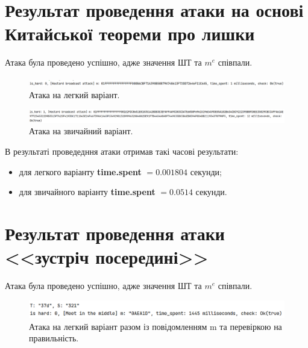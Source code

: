 \section{Результат проведення атаки на основі Китайської теореми про лишки}
Атака була проведено успішно, адже значення ШТ та $m^e$ співпали.

        \begin{figure}[!h]
            \centering
            \includegraphics[scale=0.3]{Images/chinese_easy.png}
            \caption{Атака на легкий варіант.}
            \label{fig:chinese_easy}
        \end{figure}

        \begin{figure}[!h]
            \centering
            \includegraphics[scale=0.25]{Images/chinese_normal.png}
            \caption{Атака на звичайний варіант.}
            \label{fig:chinese_hard}
        \end{figure}

В результаті проведедння атаки отримав такі часові результати:
\begin{itemize}
    \item для легкого варіанту \textbf{time.spent} $=0.001804$ секунди;  
    \item для звичайного варіанту \textbf{time.spent} $=0.0514$ секунди.
\end{itemize}

\section{Результат проведення атаки <<зустріч посередині>>}
Атака була проведено успішно, адже значення ШТ та $m^e$ співпали.

\begin{figure}[!h]
            \centering
            \includegraphics[scale=0.4]{Images/meet_in_middle_easy.png}
            \caption{Атака на легкий варіант разом із повідомленням m та перевіркою на правильність.}
            \label{fig:middle_easy}
        \end{figure}

